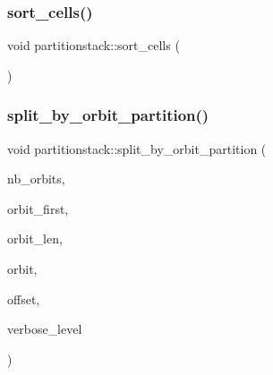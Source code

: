 \mbox{\label{classpartitionstack_a6e2783ab6d6b06f37ac21ce529e219b6}} 
\subsubsection{\texorpdfstring{sort\+\_\+cells()}{sort\_cells()}}
{\footnotesize\ttfamily void partitionstack\+::sort\+\_\+cells (\begin{DoxyParamCaption}{ }\end{DoxyParamCaption})}

\mbox{\label{classpartitionstack_a706126b1b24e8fabf88a0120c2f95e07}} 
\subsubsection{\texorpdfstring{split\+\_\+by\+\_\+orbit\+\_\+partition()}{split\_by\_orbit\_partition()}}
{\footnotesize\ttfamily void partitionstack\+::split\+\_\+by\+\_\+orbit\+\_\+partition (\begin{DoxyParamCaption}\item[{\mbox{\hyperlink{galois_8h_a09fddde158a3a20bd2dcadb609de11dc}{I\+NT}}}]{nb\+\_\+orbits,  }\item[{\mbox{\hyperlink{galois_8h_a09fddde158a3a20bd2dcadb609de11dc}{I\+NT}} $\ast$}]{orbit\+\_\+first,  }\item[{\mbox{\hyperlink{galois_8h_a09fddde158a3a20bd2dcadb609de11dc}{I\+NT}} $\ast$}]{orbit\+\_\+len,  }\item[{\mbox{\hyperlink{galois_8h_a09fddde158a3a20bd2dcadb609de11dc}{I\+NT}} $\ast$}]{orbit,  }\item[{\mbox{\hyperlink{galois_8h_a09fddde158a3a20bd2dcadb609de11dc}{I\+NT}}}]{offset,  }\item[{\mbox{\hyperlink{galois_8h_a09fddde158a3a20bd2dcadb609de11dc}{I\+NT}}}]{verbose\+\_\+level }\end{DoxyParamCaption})}

\mbox{\label{classpartitionstack_aafceac783d21309e491df61254f41244}} 
